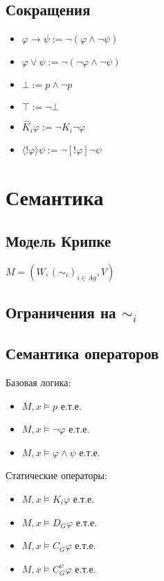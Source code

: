 \documentclass[11pt]{article}
\begin{document}
\subsection{Сокращения}
\begin{multicols}{2}
\begin{itemize}
\item $\varphi \to \psi := \neg (\varphi \wedge \neg \psi)$
\item $\varphi \vee \psi := \neg (\neg \varphi \wedge \neg \psi )$
\item $\bot:= p \wedge \neg p$
\item $\top:= \neg \bot$
\item $\hat{K}_i \varphi:= \neg K_i \neg \varphi$
\item $\langle ! \varphi \rangle \psi := \neg[!\varphi]\neg\psi $	
\end{itemize}
\end{multicols}




\section{Семантика}
\subsection{Модель Крипке}
$M= (W, (\sim_i)_{i \in Ag},  V)$
\subsection{Ограничения на $\sim_i$}
\subsection{Семантика операторов}

Базовая логика:
\begin{itemize}
\item $M, x \models p$ е.т.е.
\item $M, x \models \neg \varphi$ е.т.е.
\item $M, x \models \varphi \wedge \psi$ е.т.е.
\end{itemize}

Статические операторы:
\begin{itemize}
\item $M, x \models K_i \varphi$ е.т.е.
\item $M, x \models D_G \varphi$ е.т.е.
\item $M, x \models C_G \varphi$ е.т.е.
\item $M, x \models C^\psi_G \varphi$ е.т.е.
\end{itemize}
\end{document}
